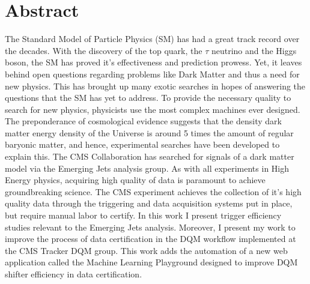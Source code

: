 \chapter*{Abstract}

The Standard Model of Particle Physics (SM) has had a great track record over the decades. With the discovery of the top quark, the $\tau$ neutrino and the Higgs boson, the SM has proved it's effectiveness and prediction prowess. Yet, it leaves behind open questions regarding problems like Dark Matter and thus a need for new physics. This has brought up many exotic searches in hopes of answering the questions that the SM has yet to address.
To provide the necessary quality to search for new physics, physicists use the most complex machines ever designed.
The preponderance of cosmological evidence suggests that the density dark matter energy density of the Universe is around 5 times the amount of regular baryonic matter, and hence, experimental searches have been developed to explain this.
The CMS Collaboration has searched for signals of a dark matter model via the Emerging Jets analysis group.
As with all experiments in High Energy physics, acquiring high quality of data is paramount to achieve groundbreaking science. The CMS experiment achieves the collection of it's high quality data through the triggering and data acquisition systems put in place, but require manual labor to certify.
In this work I present trigger efficiency studies relevant to the Emerging Jets analysis. Moreover, I present my work
to improve the process of data certification in the DQM workflow implemented at the CMS Tracker DQM group. This work adds the automation of a new web application called the Machine Learning Playground designed to improve DQM shifter efficiency in data certification.



